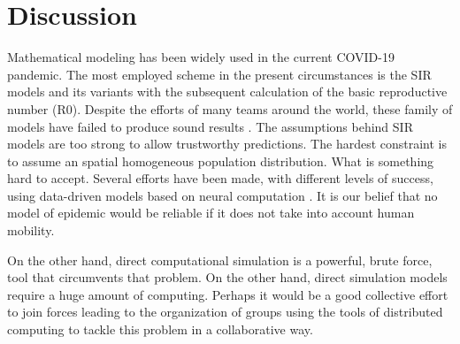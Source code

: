 \documentclass[11pt,a4paper,reqno]{amsart}
\theoremstyle{definition}
\theoremstyle{remark}
\begin{document}
\section{Discussion}
Mathematical modeling has been widely used in the current COVID-19 pandemic. The most employed scheme in the present circumstances is the SIR models and its variants with the subsequent calculation of the basic reproductive number (R0). Despite the efforts of many teams around the world, these family of models have failed to produce sound results \cite{Roda2020}. The assumptions behind SIR models are too strong to allow trustworthy predictions. The hardest constraint is to assume an spatial homogeneous population distribution. What is something hard to accept. Several efforts have been made, with different levels of success, using data-driven models based on neural computation \cite{Fokas2020}. It is our belief that no model of epidemic would be reliable if it does not take into account human mobility.


On the other hand, direct computational simulation is a powerful, brute force, tool that circumvents that problem. On the other hand, direct simulation models require a huge amount of computing. Perhaps it would be a good collective effort to join forces leading to the organization of groups using the tools of distributed computing to tackle this problem in a collaborative way.
\end{document}

